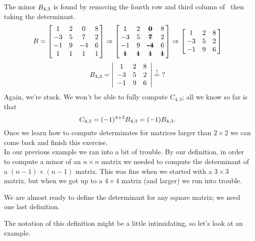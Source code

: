 {The minor $\ttb_{4,3}$ is found by removing the fourth row and third column of \ttb\ then taking the determinant.
$$\ttb = \bmx{cccc}1&2&0&8\\-3&5&7&2\\-1&9&-4&6\\1&1&1&1\emx \Rightarrow \bmx{cccc}1&2&\textbf{\sout{0}}&8\\-3&5&\textbf{\sout{7}}&2\\-1&9&\textbf{\sout{-4}}&6\\ \textbf{\sout{1}}&\textbf{\sout{1}}&\textbf{\sout{1}}&\textbf{\sout{1}}\emx \Rightarrow \bmx{ccc}1&2&8\\-3&5&2\\-1&9&6\emx$$
$$\ttb_{4,3} = \bdt{ccc}1&2&8\\-3&5&2\\-1&9&6\edt \stackrel{!}{=}\ ?$$
Again, we're stuck. We won't be able to fully compute $C_{4,3}$; all we know so far is that
$$C_{4,3} = (-1)^{4+3}\ttb_{4,3} = (-1)\ttb_{4,3}.$$ Once we learn how to compute determinates for matrices larger than $2\times 2$ we can come back and finish this exercise.}\\ %

In our previous example we ran into a bit of trouble. By our definition, in order to compute a minor of an $n\times n$ matrix we needed to compute the determinant of a $(n-1)\times(n-1)$ matrix. This was fine when we started with a $3\times3$ matrix, but when we got up to a $4\times4$ matrix (and larger) we run into trouble.

We are almost ready to define the determinant for any square matrix; we need one last definition.


The notation of this definition might be a little intimidating, so let's look at an example.\\

